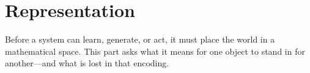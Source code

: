 \part{Representation}
\label{part:representation}

Before a system can learn, generate, or act, it must place the world in a mathematical space. This part asks what it means for one object to stand in for another---and what is lost in that encoding.
